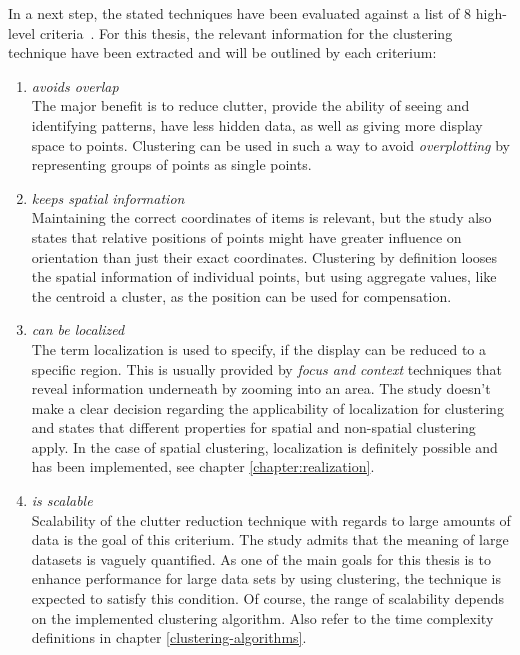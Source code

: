 In a next step, the stated techniques have been evaluated against a list of 8 high-level criteria~\cite{ellis08clutter}. For this thesis, the relevant information for the clustering technique have been extracted and will be outlined by each criterium:

\begin{enumerate}

\item \textit{avoids overlap}
\\ The major benefit is to reduce clutter, provide the ability of seeing and identifying patterns, have less hidden data, as well as giving more display space to points. Clustering can be used in such a way to avoid \textit{overplotting} by representing groups of points as single points.

\item \textit{keeps spatial information}
\\ Maintaining the correct coordinates of items is relevant, but the study also states that relative positions of points might have greater influence on orientation than just their exact coordinates. Clustering by definition looses the spatial information of individual points, but using aggregate values, like the centroid a cluster, as the position can be used for compensation. 

\item \textit{can be localized}
\\ The term localization is used to specify, if the display can be reduced to a specific region. This is usually provided by \textit{focus and context} techniques that reveal information underneath by zooming into an area. The study doesn't make a clear decision regarding the applicability of localization for clustering and states that different properties for spatial and non-spatial clustering apply. In the case of spatial clustering, localization is definitely possible and has been implemented, see chapter \ref{chapter:realization}.  

\item \textit{is scalable}
\\ Scalability of the clutter reduction technique with regards to large amounts of data is the goal of this criterium. The study admits that the meaning of large datasets is vaguely quantified. As one of the main goals for this thesis is to enhance performance for large data sets by using clustering, the technique is expected to satisfy this condition. Of course, the range of scalability depends on the implemented clustering algorithm. Also refer to the time complexity definitions in chapter \ref{clustering-algorithms}. 


\end{enumerate}
